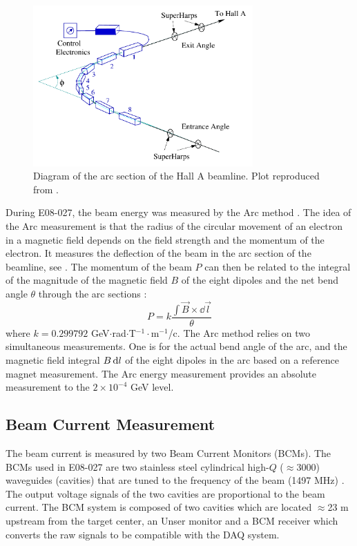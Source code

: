 \begin{figure}[b!]
  \centering
  \includegraphics[width=0.75\textwidth]{figs/arc-measurement.pdf}
  \caption[Diagram of the arc section of the beamline.]{Diagram of the arc section of the Hall A beamline. Plot reproduced from \cite{Zheng2002}.  \label{C5S2SS1F1}}
\end{figure}

During E08-027, the beam energy was measured by the Arc method \cite{Alcorn2004}. The idea of the Arc measurement is that the radius of the circular movement of an electron in a magnetic field depends on the field strength and the momentum of the electron. It measures the deflection of the beam in the arc section of the beamline, see . The momentum of the beam $P$ can then be related to the integral of the magnitude of the magnetic field $B$ of the eight dipoles and the net bend angle $\theta$ through the arc sections \cite{BEAMENERGYARC}:
\begin{equation} \label{C5S2SS1E1}
P = k \frac{\int\vec{B}\times\dd{\vec{l}}}{\theta}
\end{equation}
where $k=0.299792$ GeV$\cdot$rad$\cdot$T${}^{−1}\cdot$m${}^{−1}$/c. The Arc method relies on two simultaneous measurements. One is for the actual bend angle of the arc, and the magnetic field integral $B\dd{l}$ of the eight dipoles in the arc based on a reference magnet measurement. The Arc energy measurement provides an absolute measurement to the $2\times10^{-4}$ GeV level.

\subsection{Beam Current Measurement}
\label{C5S2SS2}

The beam current is measured by two Beam Current Monitors (BCMs). The BCMs used in E08-027 are two stainless steel cylindrical high-$Q$ ($\approx$3000) waveguides (cavities) that are tuned to the frequency of the beam (1497 MHz) \cite{Alcorn2004}. The output voltage signals of the two cavities are proportional to the beam current. The BCM system is composed of two cavities which are located $\approx$23 m upstream from the target center, an Unser monitor and a BCM receiver which converts the raw signals to be compatible with the DAQ system.

